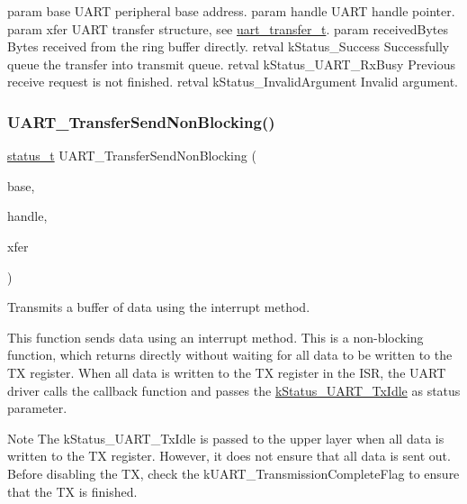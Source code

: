 param base U\+A\+RT peripheral base address. param handle U\+A\+RT handle pointer. param xfer U\+A\+RT transfer structure, see \mbox{\hyperlink{group__uart__driver_gae245db88e02822f416e4d246d49076df}{uart\+\_\+transfer\+\_\+t}}. param received\+Bytes Bytes received from the ring buffer directly. retval k\+Status\+\_\+\+Success Successfully queue the transfer into transmit queue. retval k\+Status\+\_\+\+U\+A\+R\+T\+\_\+\+Rx\+Busy Previous receive request is not finished. retval k\+Status\+\_\+\+Invalid\+Argument Invalid argument. \mbox{\label{group__uart__driver_gad89afd7db1656c5aef404bb285d0dc05}} 
\subsubsection{\texorpdfstring{UART\_TransferSendNonBlocking()}{UART\_TransferSendNonBlocking()}}
{\footnotesize\ttfamily \mbox{\hyperlink{group__ksdk__common_gaaabdaf7ee58ca7269bd4bf24efcde092}{status\+\_\+t}} U\+A\+R\+T\+\_\+\+Transfer\+Send\+Non\+Blocking (\begin{DoxyParamCaption}\item[{\mbox{\hyperlink{struct_u_a_r_t___type}{U\+A\+R\+T\+\_\+\+Type}} $\ast$}]{base,  }\item[{\mbox{\hyperlink{struct__uart__handle}{uart\+\_\+handle\+\_\+t}} $\ast$}]{handle,  }\item[{\mbox{\hyperlink{group__uart__driver_gae245db88e02822f416e4d246d49076df}{uart\+\_\+transfer\+\_\+t}} $\ast$}]{xfer }\end{DoxyParamCaption})}



Transmits a buffer of data using the interrupt method. 

This function sends data using an interrupt method. This is a non-\/blocking function, which returns directly without waiting for all data to be written to the TX register. When all data is written to the TX register in the I\+SR, the U\+A\+RT driver calls the callback function and passes the \mbox{\hyperlink{group__uart__driver_ggacef40dc8e8ac174bfe40ebcbc980f84baf36c829b1b889517bf775c0d7ce29fa6}{k\+Status\+\_\+\+U\+A\+R\+T\+\_\+\+Tx\+Idle}} as status parameter.

\begin{DoxyNote}{Note}
The k\+Status\+\_\+\+U\+A\+R\+T\+\_\+\+Tx\+Idle is passed to the upper layer when all data is written to the TX register. However, it does not ensure that all data is sent out. Before disabling the TX, check the k\+U\+A\+R\+T\+\_\+\+Transmission\+Complete\+Flag to ensure that the TX is finished.
\end{DoxyNote}

